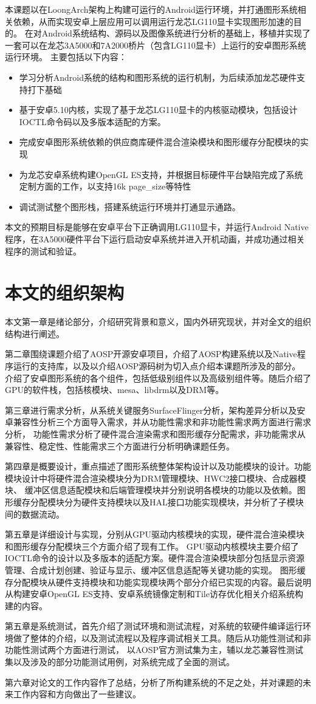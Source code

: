 本课题以在LoongArch架构上构建可运行的Android运行环境，并打通图形系统相关依赖，从而实现安卓上层应用可以调用运行龙芯LG110显卡实现图形加速的目的。
在对Android系统结构、源码以及图像系统进行分析的基础上，移植并实现了一套可以在龙芯3A5000和7A2000桥片（包含LG110显卡）上运行的安卓图形系统运行环境。
主要包括以下内容：
\begin{itemize}
  \item 学习分析Android系统的结构和图形系统的运行机制，为后续添加龙芯硬件支持打下基础
  \item 基于安卓5.10内核，实现了基于龙芯LG110显卡的内核驱动模块，包括设计IOCTL命令码以及多版本适配的方案。
  \item 完成安卓图形系统依赖的供应商库硬件混合渲染模块和图形缓存分配模块的实现
  \item 为龙芯安卓系统构建OpenGL ES支持，并根据目标硬件平台缺陷完成了系统定制方面的工作，以支持16k page\_size等特性
  \item 调试测试整个图形栈，搭建系统运行环境并打通显示通路。
\end{itemize}
本文的预期目标是能够在安卓平台下正确调用LG110显卡，并运行Android Native程序，在3A5000硬件平台下运行启动安卓系统并进入开机动画，并成功通过相关
程序的测试和验证。

\section{本文的组织架构}
本文第一章是绪论部分，介绍研究背景和意义，国内外研究现状，并对全文的组织结构进行阐述。

第二章围绕课题介绍了AOSP开源安卓项目，介绍了AOSP构建系统以及Native程序运行的支持库，以及以介绍AOSP源码树为切入点介绍本课题所涉及的部分。
介绍了安卓图形系统的各个组件，包括低级别组件以及高级别组件等。随后介绍了GPU的软件栈，包括核模块、mesa、libdrm以及DRM等。

第三章进行需求分析，从系统关键服务SurfaceFlinger分析，架构差异分析以及安卓兼容性分析三个方面导入需求，并从功能性需求和非功能性需求两方面进行需求分析，
功能性需求分析了硬件混合渲染需求和图形缓存分配需求，非功能需求从兼容性、稳定性、性能需求三个方面进行分析明确课题任务。

第四章是概要设计，重点描述了图形系统整体架构设计以及功能模块的设计。功能模块设计中将硬件混合渲染模块分为DRM管理模块、HWC2接口模块、合成器模块、
缓冲区信息适配模块和后端管理模块并分别说明各模块的功能以及依赖。图形缓存分配模块分为硬件支持模块以及HAL接口功能实现模块，并分析了子模块间的数据流动。

第五章是详细设计与实现，分别从GPU驱动内核模块的实现，硬件混合渲染模块和图形缓存分配模块三个方面介绍了现有工作。
GPU驱动内核模块主要介绍了IOCTL命令的设计以及多版本的适配方案。硬件混合渲染模块部分包括显示资源管理、合成计划创建、验证与显示、缓冲区信息适配等关键功能的实现。
图形缓存分配模块从硬件支持模块和功能实现模块两个部分介绍已实现的内容。最后说明从构建安卓OpenGL ES支持、安卓系统镜像定制和Tile访存优化相关介绍系统构建的内容。

第五章是系统测试，首先介绍了测试环境和测试流程，对系统的软硬件编译运行环境做了整体的介绍，以及测试流程以及程序调试相关工具。随后从功能性测试和非功能性测试两个方面进行测试，
以AOSP官方测试集为主，辅以龙芯兼容性测试集以及涉及的部分功能测试用例，对系统完成了全面的测试。

第六章对论文的工作内容作了总结，分析了所构建系统的不足之处，并对课题的未来工作内容和方向做出了一些建议。

